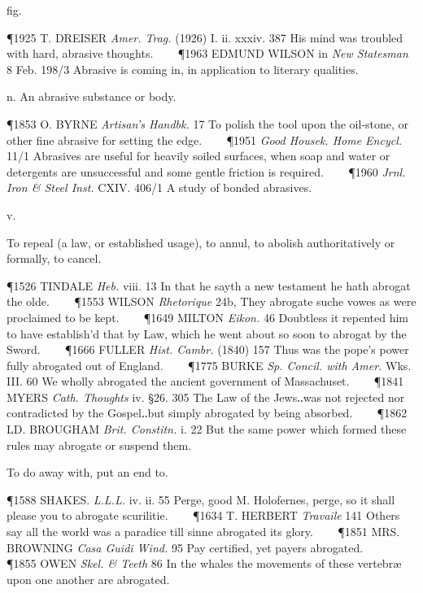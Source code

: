 \begin{description}[wide, labelwidth=!, labelindent=0pt]
\begin{myenumerate}
 fig. 

\P 1925 T. DREISER \textit{Amer. Trag.} (1926) I. ii. xxxiv. 387 His mind was troubled
with hard, abrasive thoughts.    
\P 1963 EDMUND WILSON in \textit{New Statesman} 8 Feb. 198/3 Abrasive is coming in, 
in application to literary qualities.

 n. An abrasive substance or body. 

\P 1853 O. BYRNE \textit{Artisan's Handbk.} 17 To polish the tool upon the oil-stone, or
other fine abrasive for setting the edge.    
\P 1951 \textit{Good Housek. Home Encycl.} 11/1
Abrasives are useful for heavily soiled surfaces, when soap and water or
detergents are unsuccessful and some gentle friction is required.    
\P 1960 \textit{Jrnl. Iron \& Steel Inst.} CXIV. 406/1 A study of bonded abrasives.
\end{myenumerate}


  v.

\noindent {}

\vspace{-0.3cm}

\begin{myenumerate}
 To repeal (a law, or established usage), to annul, to abolish
authoritatively or formally, to cancel. 

\P 1526 TINDALE \textit{Heb.} viii. 13 In that he sayth a new testament he hath abrogat
the olde.    
\P 1553 WILSON \textit{Rhetorique} 24b, They abrogate suche vowes as were
proclaimed to be kept.    
\P 1649 MILTON \textit{Eikon.} 46 Doubtless it repented him to
have establish'd that by Law, which he went about so soon to abrogat by the
Sword.    
\P 1666 FULLER \textit{Hist. Cambr.} (1840) 157 Thus was the pope's power fully
abrogated out of England.    
\P 1775 BURKE \textit{Sp. Concil. with Amer.} Wks. III. 60 We
wholly abrogated the ancient government of Massachuset.    
\P 1841 MYERS \textit{Cath. Thoughts} iv. §26. 305 The Law of the Jews‥was not rejected nor contradicted by
the Gospel‥but simply abrogated by being absorbed.    
\P 1862 LD. BROUGHAM \textit{Brit. Constitn.} i. 22 But the same power which formed these rules may abrogate or
suspend them.

 To do away with, put an end to. 

\P 1588 SHAKES. \textit{L.L.L.} iv. ii. 55 Perge, good M. Holofernes, perge, so it shall
please you to abrogate scurilitie.    
\P 1634 T. HERBERT \textit{Travaile} 141 Others say
all the world was a paradice till sinne abrogated its glory.    
\P 1851 MRS. BROWNING \textit{Casa Guidi Wind.} 95 Pay certified, yet payers abrogated.    
\P 1855 OWEN \textit{Skel. \& Teeth} 86 In the whales the movements of these vertebræ upon one another
are abrogated.
 

\end{myenumerate}
\end{description}
